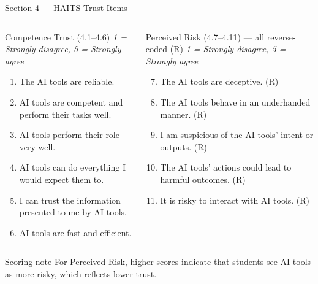\documentclass[10pt,aspectratio=169]{beamer}
\begin{document}
\begin{frame}[shrink]{Section 4 --- HAITS Trust Items}
  \small
  \begin{columns}[T]
    \begin{block}{Competence Trust (4.1--4.6)}
      \textit{1 = Strongly disagree, 5 = Strongly agree}
      \begin{enumerate}
        \item The AI tools are reliable.
        \item AI tools are competent and perform their tasks well.
        \item AI tools perform their role very well.
        \item AI tools can do everything I would expect them to.
        \item I can trust the information presented to me by AI tools.
        \item AI tools are fast and efficient.
      \end{enumerate}
    \end{block}
    \begin{block}{Perceived Risk (4.7--4.11) --- all reverse-coded (R)}
      \textit{1 = Strongly disagree, 5 = Strongly agree}
      \begin{enumerate}
        \setcounter{enumi}{6}
        \item The AI tools are deceptive. (R)
        \item The AI tools behave in an underhanded manner. (R)
        \item I am suspicious of the AI tools' intent or outputs. (R)
        \item The AI tools' actions could lead to harmful outcomes. (R)
        \item It is risky to interact with AI tools. (R)
      \end{enumerate}
    \end{block}
  \end{columns}
  \vspace{0.4em}
  \begin{exampleblock}{Scoring note}
    For Perceived Risk, higher scores indicate that students see AI tools as more risky, which reflects lower trust.
  \end{exampleblock}
\end{frame}
\end{document}
